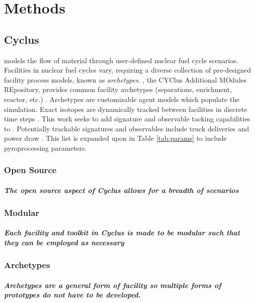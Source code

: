\chapter[Methods]{Methods}
\section{Cyclus}

\Cyclus models the flow of material through user-defined nuclear fuel cycle scenarios. Facilities in nuclear fuel cycles vary, 
requiring a diverse collection of pre-designed facility process models, known as \emph{archetypes}. \Cycamore, the CYClus 
Additional MOdules REpository, provides common facility archetypes (separations, enrichment, reactor, etc.)
\cite{carlsen_cycamore_2014}. Archetypes are customizable agent models which populate the simulation. Exact isotopes are dynamically tracked between facilities in discrete time steps \cite{huff_fundamental_2016}. This work seeks to add signature and observable tacking capabilities to \Cyclus. Potentially trackable signatures and observables include truck deliveries and  power draw  \cite{Hou_2016,Yilmaz_2016}. This list is expanded upon in Table \ref{tab:params} to include pyroprocessing parameters.

\subsection{Open Source}

\paragraph{The open source aspect of Cyclus allows for a breadth of scenarios}

\subsection{Modular}

\paragraph{Each facility and toolkit in Cyclus is made to be modular such that they can be employed as necessary}

\subsection{Archetypes}

\paragraph{Archetypes are a general form of facility so multiple forms of prototypes do not have to be developed.}

